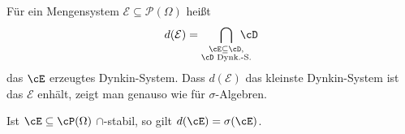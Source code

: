 
\marginpar{\textcolor{red}{Vorlesung 3}}

\begin{deff}
F\"ur ein Mengensystem $\mathcal E\subseteq \mathcal P(\Omega)$ hei\ss t
	\[ d(\mathcal{E}) = \bigcap\limits_{\substack{\cE \subseteq \cD,\\ \cD \text{ Dynk.-S.}}} \! \! \! \! \! \! \! \cD \] das $\cE$ erzeugtes Dynkin-System. Dass $d(\mathcal E)$ das kleinste Dynkin-System ist das $\mathcal E$ enh\"alt, zeigt man genauso wie f\"ur $\sigma$-Algebren.
\end{deff}

\begin{satz} \label{Hauptsatz}
	Ist $\cE \subseteq \cP (\Omega)$ $\cap$-stabil, so gilt $d(\cE) = \sigma(\cE)$.
\end{satz}

